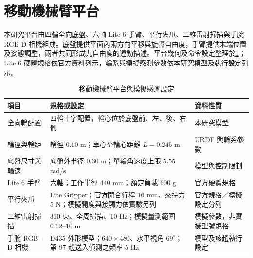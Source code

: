 
\section{移動機械臂平台}
\label{sec:mobile_manipulator_platform}

本研究平台由四輪全向底盤、六軸 Lite 6 手臂、平行夾爪、二維雷射掃描與手腕 RGB-D 相機組成。底盤提供平面內兩方向平移與旋轉自由度，手臂提供末端位置及姿態調整，兩者共同形成九自由度的運動描述。平台幾何及命令設定整理於\cref{tab:platform_specifications}；Lite 6 硬體規格依官方資料列示\cite{ufactorylite6specs}，輪系與模擬感測參數依本研究模型及執行設定列示。

\begin{table}[htbp]
    \centering
    \caption{移動機械臂平台與模擬感測設定}
    \label{tab:platform_specifications}
    \begingroup
    \small
    \renewcommand{\arraystretch}{1.25}
    \begin{tabular}{|p{}|p{}|p{}|}
        \hline
        項目 & 規格或設定 & 資料性質 \\
        \hline
        全向輪配置 & 四輪十字配置，輪心位於底盤前、左、後、右側 & 本研究模型 \\
        \hline
        輪徑與輪距 & 輪徑 $0.10$ m；車心至輪心距離 $L=0.245$ m & URDF 與輪系參數 \\
        \hline
        底盤尺寸與輪速 & 底盤外半徑 $0.30$ m；單輪角速度上限 $5.55$ rad/s & 模型與控制限制 \\
        \hline
        Lite 6 手臂 & 六軸；工作半徑 $440$ mm；額定負載 $600$ g & 官方硬體規格 \\
        \hline
        平行夾爪 & Lite Gripper；官方開合行程 $16$ mm、夾持力 $5$ N；模擬開度與接觸力依實驗另列 & 官方規格／模擬設定分列 \\
        \hline
        二維雷射掃描 & $360$ 束、全周掃描、$10$ Hz；模擬量測範圍 $0.12$--$10$ m & 模擬參數，非實機型號規格 \\
        \hline
        手腕 RGB-D 相機 & D435 外形模型；$640\times480$、水平視角 $69^{\circ}$；第 97 趟送入偵測之頻率 $5$ Hz & 模型及該趟執行設定 \\
        \hline
    \end{tabular}
    \endgroup
\end{table}

